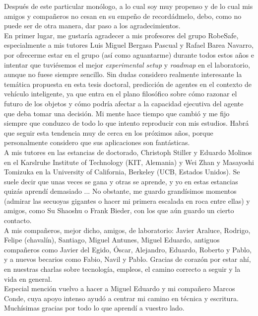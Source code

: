 Después de este particular monólogo, a lo cual soy muy propenso y de lo cual mis amigos y compañeros no cesan en su empeño de recordádmelo, debo, como no puede ser de otra manera, dar paso a los agradecimientos. \\

En primer lugar, me gustaría agradecer a mis profesores del grupo RobeSafe, especialmente a mis tutores Luis Miguel Bergasa Pascual y Rafael Barea Navarro, por ofrecerme estar en el grupo (así como aguantarme) durante todos estos años e intentar que tuviésemos el mejor \textit{experimental setup} y \textit{roadmap} en el laboratorio, aunque no fuese siempre sencillo. Sin dudas considero realmente interesante la temática propuesta en esta tesis doctoral, predicción de agentes en el contexto de vehículo inteligente, ya que entra en el plano filosófico sobre cómo razonar el futuro de los objetos y cómo podría afectar a la capacidad ejecutiva del agente que deba tomar una decisión. Mi mente hace tiempo que cambió y me fijo siempre que conduzco de todo lo que intento reproducir con mis estudios. Habrá que seguir esta tendencia muy de cerca en los próximos años, porque personalmente considero que sus aplicaciones son fantásticas. \\

A mis tutores en las estancias de doctorado, Christoph Stiller y Eduardo Molinos en el Karslruhe Institute of Technology (KIT, Alemania) y Wei Zhan y Masayoshi Tomizuka en la University of California, Berkeley (UCB, Estados Unidos). Se suele decir que unas veces se gana y otras se aprende, y yo en estas estancias quizás aprendí demasiado ... No obstante, me guardo grandísimos momentos (admirar las secuoyas gigantes o hacer mi primera escalada en roca entre ellas) y amigos, como Su Shaoshu o Frank Bieder, con los que aún guardo un cierto contacto. \\

A mis compañeros, mejor dicho, amigos, de laboratorio: Javier Araluce, Rodrigo, Felipe (chavalín), Santiago, Miguel Antunes, Miguel Eduardo,
antiguos compañeros como Javier del Egido, Óscar, Alejandro, Eduardo, Roberto y Pablo, y a nuevos becarios como Fabio, Navil y Pablo. Gracias de corazón por estar ahí, en nuestras charlas sobre tecnología, empleos, el camino correcto a seguir y la vida en general. \\

Especial mención vuelvo a hacer a Miguel Eduardo y mi compañero Marcos Conde, cuya apoyo intenso ayudó a centrar mi camino en técnica y escritura. Muchísimas gracias por todo lo que aprendí a vuestro lado. \\

